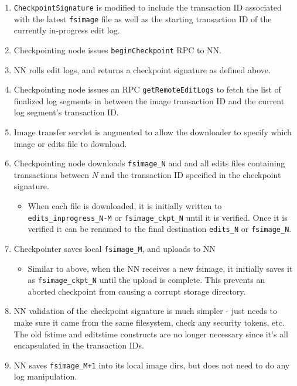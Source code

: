 \documentclass{article}
\begin{document}
\label{2nn-checkpoint}
\begin{enumerate}
\item {\tt CheckpointSignature} is modified to include the transaction ID associated with the latest {\tt fsimage} file as well as the starting transaction ID of the currently in-progress edit log.
\item Checkpointing node issues {\tt beginCheckpoint} RPC to NN.
\item NN rolls edit logs, and returns a checkpoint signature as defined above.
\item Checkpointing node issues an RPC {\tt getRemoteEditLogs} to fetch the list of finalized log segments in between the image transaction ID and the current log segment's transaction ID.
\item Image transfer servlet is augmented to allow the downloader to specify which image or edits file to download.
\item Checkpointing node downloads {\tt fsimage\_N} and and all edits files containing transactions between $N$ and the transaction ID specified in the checkpoint signature.
  \begin{itemize}
  \item When each file is downloaded, it is initially written to {\tt edits\_inprogress\_N-M} or {\tt fsimage\_ckpt\_N} until it is verified. Once it is verified it can be renamed to the final destination {\tt edits\_N} or {\tt fsimage\_N}.
  \end{itemize}
 
\item Checkpointer saves local {\tt fsimage\_M}, and uploads to NN
  \begin{itemize}
  \item Similar to above, when the NN receives a new fsimage, it initially saves it as {\tt fsimage\_ckpt\_N} until the upload is complete. This prevents an aborted checkpoint from causing a corrupt storage directory.
  \end{itemize}
\item NN validation of the checkpoint signature is much simpler - just needs to make sure it came from the same filesystem, check any security tokens, etc. The old fstime and editstime constructs are no longer necessary since it's all encapsulated in the transaction IDs.
\item NN saves {\tt fsimage\_M+1} into its local image dirs, but does not need to do any log manipulation.
\end{enumerate}
\end{document}
